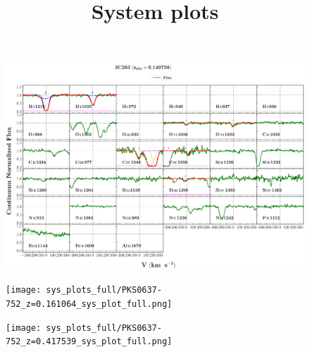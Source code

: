 \documentclass[12pt]{report}
\title{\textbf{System plots}}
\begin{document}
\maketitle




\begin{landscape}

    \begin{figure}
    \centering
    \vspace{-20mm}
    \hspace*{-35mm}
    \includegraphics[width=1.25\linewidth]{sys_plots_full/3C263_z=0.140756_sys_plot_full.png}
    \end{figure}
    
\end{landscape}


\begin{landscape}

    \begin{figure}
    \centering
    \vspace{-20mm}
    \hspace*{-35mm}
    \texttt{[image: sys\_plots\_full/PKS0637-752\_z=0.161064\_sys\_plot\_full.png]}
    \end{figure}
    
\end{landscape}


\begin{landscape}

    \begin{figure}
    \centering
    \vspace{-20mm}
    \hspace*{-35mm}
    \texttt{[image: sys\_plots\_full/PKS0637-752\_z=0.417539\_sys\_plot\_full.png]}
    \end{figure}
    
\end{landscape}
\end{document}
